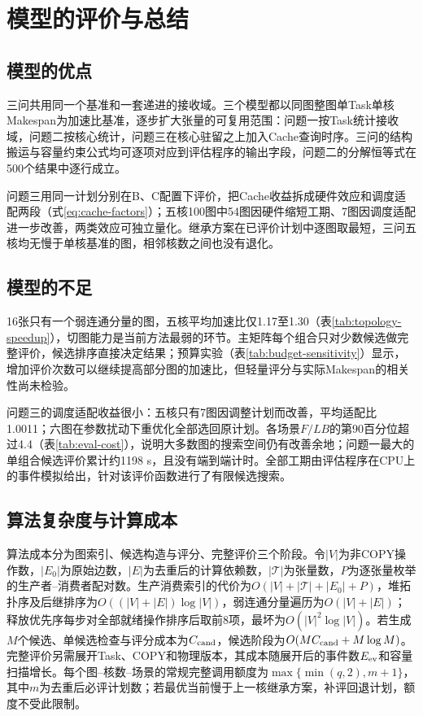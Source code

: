 \section{模型的评价与总结}
\label{sec:evaluation}

\subsection{模型的优点}
三问共用同一个基准和一套递进的接收域。三个模型都以同图整图单Task单核Makespan为加速比基准，逐步扩大张量的可复用范围：问题一按Task统计接收域，问题二按核心统计，问题三在核心驻留之上加入Cache查询时序。三问的结构搬运与容量约束公式均可逐项对应到评估程序的输出字段，问题二的分解恒等式在500个结果中逐行成立。

问题三用同一计划分别在B、C配置下评价，把Cache收益拆成硬件效应和调度适配两段（式\eqref{eq:cache-factors}）；五核100图中54图因硬件缩短工期、7图因调度适配进一步改善，两类效应可独立量化。继承方案在已评价计划中逐图取最短，三问五核均无慢于单核基准的图，相邻核数之间也没有退化。

\subsection{模型的不足}
16张只有一个弱连通分量的图，五核平均加速比仅1.17至1.30（表\ref{tab:topology-speedup}），切图能力是当前方法最弱的环节。主矩阵每个组合只对少数候选做完整评价，候选排序直接决定结果；预算实验（表\ref{tab:budget-sensitivity}）显示，增加评价次数可以继续提高部分图的加速比，但轻量评分与实际Makespan的相关性尚未检验。

问题三的调度适配收益很小：五核只有7图因调整计划而改善，平均适配比1.0011；六图在参数扰动下重优化全部选回原计划。各场景$F/LB$的第90百分位超过4.4（表\ref{tab:eval-cost}），说明大多数图的搜索空间仍有改善余地；问题一最大的单组合候选评价累计约1198 s，且没有端到端计时。全部工期由评估程序在CPU上的事件模拟给出，针对该评价函数进行了有限候选搜索。

\subsection{算法复杂度与计算成本}
算法成本分为图索引、候选构造与评分、完整评价三个阶段。令$|V|$为非COPY操作数，$|E_0|$为原始边数，$|E|$为去重后的计算依赖数，$|\mathcal T|$为张量数，$P$为逐张量枚举的生产者--消费者配对数。生产消费索引的代价为$O(|V|+|\mathcal T|+|E_0|+P)$，堆拓扑序及后继排序为$O((|V|+|E|)\log |V|)$，弱连通分量遍历为$O(|V|+|E|)$；释放优先序每步对全部就绪操作排序后取前8项，最坏为$O(|V|^2\log |V|)$。若生成$M$个候选、单候选检查与评分成本为$C_{\rm cand}$，候选阶段为$O(MC_{\rm cand}+M\log M)$。完整评价另需展开Task、COPY和物理版本，其成本随展开后的事件数$E_{\rm ev}$和容量扫描增长。每个图--核数--场景的常规完整调用额度为$\max\{\min(q,2),m+1\}$，其中$m$为去重后必评计划数；若最优当前慢于上一核继承方案，补评回退计划，额度不受此限制。

